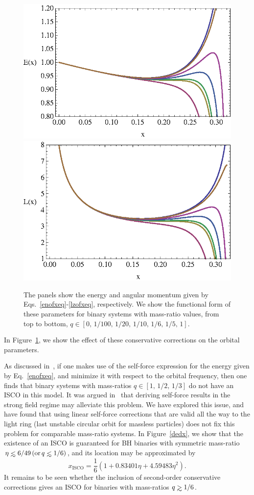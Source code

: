 \documentclass[aps,prd,showpacs,amssymb,floatfix,nofootinbib,superscriptaddress]{revtex4-1}%
\def\lesssim{\mathrel{\hbox{\rlap{\hbox{\lower4pt\hbox{$\sim$}}}\hbox{$<$}}}}
\def\gtrsim{\mathrel{\hbox{\rlap{\hbox{\lower4pt\hbox{$\sim$}}}\hbox{$>$}}}}
\begin{document}
\begin{figure}[ht]
\centerline{
\includegraphics[height=0.33\textwidth,  clip]{eofx.eps}
\includegraphics[height=0.33\textwidth,  clip]{lofx.eps}
}
\caption{The panels show the energy and angular momentum given by Eqs.~\eqref{enofxeq}-\eqref{lzofxeq}, respectively. We show the functional form of these parameters for binary systems with mass-ratio values, from top to bottom, \(q \in [0,\, 1/100, \,1/20, \,1/10, \,1/6, \,1/5, \,1 ]\).  }
\label{orbitalparams}
\end{figure}

\noindent In Figure~\ref{orbitalparams}, we  show the effect of these conservative corrections on the orbital parameters.


As discussed in~\cite{barus}, if one makes use of the self-force expression for the energy given by Eq.~\eqref{enofxeq}, and minimize it with respect to the orbital frequency, then one finds that binary systems with mass-ratios \(q\in [1, \,1/2, \,1/3]\) do not have an ISCO in this model. It was argued in~\cite{barus} that deriving self-force results in the strong field regime may alleviate this problem. We have explored this issue, and have found that using linear self-force corrections that are valid all the way to the light ring (last unstable circular orbit for massless particles) does not fix this problem for comparable mass-ratio systems. In Figure~\ref{dedx}, we show that the existence of an ISCO is guaranteed for BH binaries with symmetric mass-ratio \(\eta\lesssim 6/49\, ({\rm{or}}\, q \lesssim 1/6)\), and its location may be approximated by
\begin{equation}
x_{\mathrm{ISCO}}=\frac{1}{6}\left(1+ 0.83401\eta+4.59483\eta^2\right).
\label{xisco_eq}
\end{equation}
\noindent It remains to be seen whether the inclusion of second-order conservative corrections gives an ISCO for binaries with mass-ratios \(q\gtrsim 1/6\). 
\end{document}
